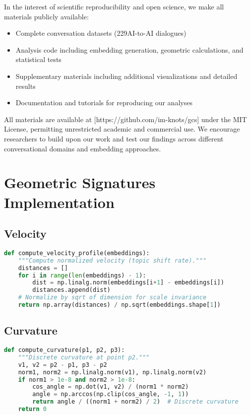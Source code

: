 \documentclass[11pt,letterpaper]{article}
\newcommand{\totalConversations}{229}
\begin{document}
In the interest of scientific reproducibility and open science, we make all materials publicly available:
\begin{itemize}
\item Complete conversation datasets (\totalConversations AI-to-AI dialogues)
\item Analysis code including embedding generation, geometric calculations, and statistical tests
\item Supplementary materials including additional visualizations and detailed results
\item Documentation and tutorials for reproducing our analyses
\end{itemize}

All materials are available at [https://github.com/im-knots/gcs] under the MIT License, permitting unrestricted academic and commercial use. We encourage researchers to build upon our work and test our findings across different conversational domains and embedding approaches.




\appendix

\section{Geometric Signatures Implementation}
\label{app:geometric-signatures}

\subsection{Velocity}
\label{app:geometric-signatures-velocity}
\begin{lstlisting}[language=Python, basicstyle=\small]
def compute_velocity_profile(embeddings):
    """Compute normalized velocity (topic shift rate)."""
    distances = []
    for i in range(len(embeddings) - 1):
        dist = np.linalg.norm(embeddings[i+1] - embeddings[i])
        distances.append(dist)
    # Normalize by sqrt of dimension for scale invariance
    return np.array(distances) / np.sqrt(embeddings.shape[1])
\end{lstlisting}

\subsection{Curvature}
\label{app:geometric-signatures-curvature}
\begin{lstlisting}[language=Python, basicstyle=\small]
def compute_curvature(p1, p2, p3):
    """Discrete curvature at point p2."""
    v1, v2 = p2 - p1, p3 - p2
    norm1, norm2 = np.linalg.norm(v1), np.linalg.norm(v2)
    if norm1 > 1e-8 and norm2 > 1e-8:
        cos_angle = np.dot(v1, v2) / (norm1 * norm2)
        angle = np.arccos(np.clip(cos_angle, -1, 1))
        return angle / ((norm1 + norm2) / 2)  # Discrete curvature
    return 0
\end{lstlisting}
\end{document}
